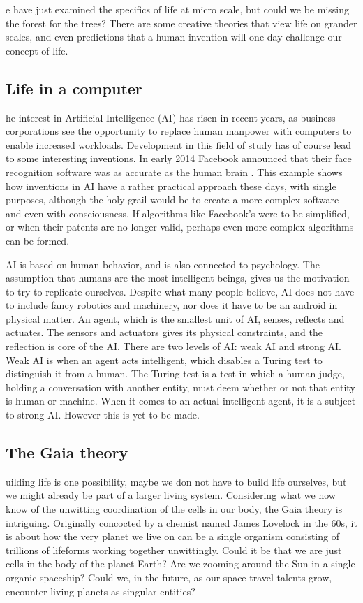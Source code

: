 e have just examined the specifics of life at micro scale, but could we be missing the forest for the trees?
There are some creative theories that view life on grander scales, and even predictions that a human invention will one day challenge our concept of life.

\subsection{Life in a computer}
he interest in Artificial Intelligence (AI) has risen in recent years, as business corporations see the opportunity to replace human manpower with computers to enable increased workloads.
Development in this field of study has of course lead to some interesting inventions.
In early 2014 Facebook announced that their face recognition software was as accurate as the human brain \cite{facebook}.
This example shows how inventions in AI have a rather practical approach these days, with single purposes, although the holy grail would be to create a more complex software and even with consciousness.
If algorithms like Facebook's were to be simplified, or when their patents are no longer valid, perhaps even more complex algorithms can be formed.

AI is based on human behavior, and is also connected to psychology.
The assumption that humans are the most intelligent beings, gives us the motivation to try to replicate ourselves.
Despite what many people believe, AI does not have to include fancy robotics and machinery, nor does it have to be an android in physical matter.
An agent, which is the smallest unit of AI, senses, reflects and actuates.
The sensors and actuators gives its physical constraints, and the reflection is core of the AI.
There are two levels of AI: weak AI and strong AI.
Weak AI is when an agent acts intelligent, which disables a Turing test to distinguish it from a human.
The Turing test is a test in which a human judge, holding a conversation with another entity, must deem whether or not that entity is human or machine. 
When it comes to an actual intelligent agent, it is a subject to strong AI.
However this is yet to be made.



\subsection{The Gaia theory}
uilding life is one possibility, maybe we don not have to build life ourselves, but we might already be part of a larger living system.
Considering what we now know of the unwitting coordination of the cells in our body, the Gaia theory is intriguing.
Originally concocted by a chemist named James Lovelock\cite{Lovelock} in the 60s, it is about how the very planet we live on can be a single organism consisting of trillions of lifeforms working together unwittingly.
Could it be that we are just cells in the body of the planet Earth?
Are we zooming around the Sun in a single organic spaceship?
Could we, in the future, as our space travel talents grow, encounter living planets as singular entities?